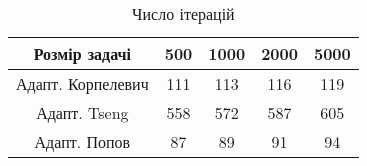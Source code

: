 \begin{table}[H]
	\centering
	\begin{tabular}{|c||c|c|c|c|}\hline
		Розмір задачі & 500 & 1000 & 2000 & 5000 \\ \hline \hline
		Адапт. Корпелевич & 111 & 113 & 116 & 119 \\ \hline
		Адапт. Tseng & 558 & 572 & 587 & 605 \\ \hline
		Адапт. Попов & 87 & 89 & 91 & 94 \\ \hline
	\end{tabular}
	\caption{Число ітерацій}
\end{table}
